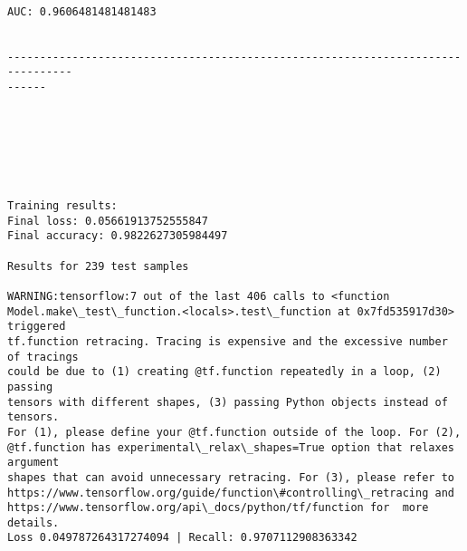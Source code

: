 \documentclass[11pt]{article}
\begin{document}
    \begin{center}
    \end{center}
    { \hspace*{\fill} \\}
    
    \begin{Verbatim}[commandchars=\\\{\}]
AUC: 0.9606481481481483


--------------------------------------------------------------------------------
------


    \end{Verbatim}

    \begin{center}
    \end{center}
    { \hspace*{\fill} \\}
    
    \begin{center}
    \end{center}
    { \hspace*{\fill} \\}
    
    \begin{Verbatim}[commandchars=\\\{\}]

Training results:
Final loss: 0.05661913752555847
Final accuracy: 0.9822627305984497

Results for 239 test samples

WARNING:tensorflow:7 out of the last 406 calls to <function
Model.make\_test\_function.<locals>.test\_function at 0x7fd535917d30> triggered
tf.function retracing. Tracing is expensive and the excessive number of tracings
could be due to (1) creating @tf.function repeatedly in a loop, (2) passing
tensors with different shapes, (3) passing Python objects instead of tensors.
For (1), please define your @tf.function outside of the loop. For (2),
@tf.function has experimental\_relax\_shapes=True option that relaxes argument
shapes that can avoid unnecessary retracing. For (3), please refer to
https://www.tensorflow.org/guide/function\#controlling\_retracing and
https://www.tensorflow.org/api\_docs/python/tf/function for  more details.
Loss 0.049787264317274094 | Recall: 0.9707112908363342



    \end{Verbatim}
\end{document}
